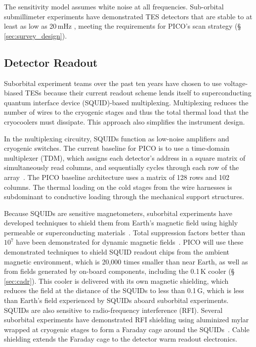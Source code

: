 The sensitivity model assumes white noise at all frequencies. Sub-orbital submillimeter experiments have demonstrated TES detectors that are stable to at least as low as 20\,mHz \citep{Rahlin2014}, meeting the requirements for PICO's scan strategy (\S\,\ref{sec:survey_design}). 

\subsection{Detector Readout}
\label{sec:detector_readout} %

Suborbital experiment teams over the past ten years have chosen to use voltage-biased TESs because their current readout scheme lends itself to superconducting quantum interface device (SQUID)-based multiplexing. Multiplexing reduces the number of wires to the cryogenic stages and thus the total thermal load that the cryocoolers must dissipate. This approach also simplifies the instrument design.

In the multiplexing circuitry, SQUIDs function as low-noise amplifiers and cryogenic switches. The current baseline for PICO is to use a time-domain multiplexer (TDM), which assigns each detector's address in a square matrix of simultaneously read columns, and sequentially cycles through each row of the array~\citep{Henderson2016}. The PICO baseline architecture uses a matrix of 128 rows and 102 columns. The thermal loading on the cold stages from the wire harnesses is subdominant to conductive loading through the mechanical support structures.

Because SQUIDs are sensitive magnetometers, suborbital experiments have developed techniques to shield them from Earth's magnetic field using highly permeable or superconducting materials~\citep{Hui2018}.  Total suppression factors better than $10^7$ have been demonstrated for dynamic magnetic fields~\citep{Runyan2010}. PICO will use these demonstrated techniques to shield SQUID readout chips from the ambient magnetic environment, which is 20,000 times smaller than near Earth, as well as from fields generated by on-board components, including the 0.1\,K cooler (\S\,\ref{sec:cadr}). This cooler is delivered with its own magnetic shielding, which reduces the field at the distance of the SQUIDs to less than 0.1\,G, which is less than Earth's field experienced by SQUIDs aboard suborbital experiments.
%
SQUIDs are also sensitive to radio-frequency interference (RFI). Several suborbital experiments have demonstrated RFI shielding using aluminized mylar wrapped at cryogenic stages to form a Faraday cage around the SQUIDs~\citep{Kermish2012,EBEX2018,BICEP2014}. Cable shielding extends the Faraday cage to the detector warm readout electronics.

